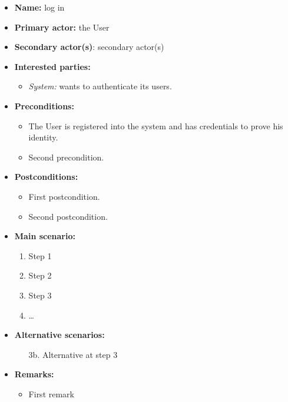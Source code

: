 \documentclass[english]{sareport}
\begin{document}
\begin{itemize}
    \item \textbf{Name:} log in
    \item \textbf{Primary actor:} the User
    \item \textbf{Secondary actor(s)}: secondary actor(s)
    \item \textbf{Interested parties:} 
        \begin{itemize}
            \item \textit{System:} wants to authenticate its users.
        \end{itemize}

    \item \textbf{Preconditions:}
        \begin{itemize}
            \item The User is registered into the system and has credentials to prove his identity.
            \item Second precondition.
        \end{itemize}

    \item \textbf{Postconditions:}
        \begin{itemize}
            \item First postcondition.
            \item Second postcondition.
        \end{itemize}
        
    \item \textbf{Main scenario:} 
    \begin{enumerate}
       \item Step 1
       \item Step 2
       \item Step 3
       \item \ldots
    \end{enumerate}

    \item \textbf{Alternative scenarios:} 
    \begin{enumerate}
        \item [3b.] Alternative at step 3
    \end{enumerate}
    
    \item \textbf{Remarks:}
        \begin{itemize}
            \item First remark
        \end{itemize}
\end{itemize}
\end{document}
